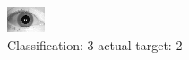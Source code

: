 \begin{figure}[h!]
\begin{center}
\includegraphics[width=0.60\columnwidth]{figures/ID1621_class_3_target_2.png}
\end{center}
\caption{ Classification: 3 actual target: 2}
\label{fig:ID1621_class_3_target_2}
\end{figure}

